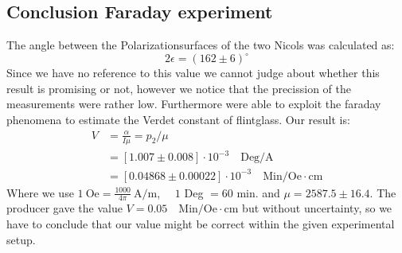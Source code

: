 \subsection{Conclusion Faraday experiment}
The angle between the Polarizationsurfaces of the two Nicols was calculated as:\\
\begin{equation*}
2\epsilon = (162\pm 6) ^{\circ} 
\end{equation*}
Since we have no reference to this value we cannot judge about whether this result is promising
or not, however we notice that the precission of the measurements were rather low.
Furthermore were able to exploit the
faraday phenomena to estimate the Verdet constant of flintglass.
Our result is:
\begin{align*}
    V &= \frac{\alpha}{I\mu}   = p_2 / \mu \\
      &= \left [ 1.007 \pm 0.008 \right ]\cdot 10^{-3} \quad \mathrm{Deg/A} \\
      &= \left [ 0.04868 \pm 0.00022 \right ] \cdot 10^{-3} \quad \mathrm{Min/Oe\cdot cm}
\end{align*}
Where we use $1\ \mathrm{Oe} = \frac{1000}{4\pi}\ \mathrm{A/m}$, $\quad1$ Deg $=60$ min. and $\mu = 2587.5\pm16.4$.
The producer gave the value $V = 0.05 \quad \mathrm{Min/Oe \cdot cm}$ but without uncertainty, so
we have to conclude that our value might be correct within the given experimental setup. 

